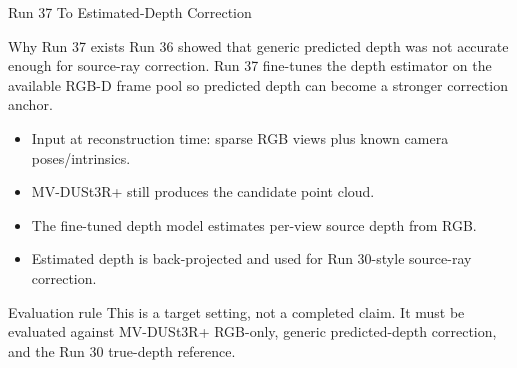 \begin{frame}{Run 37 To Estimated-Depth Correction}
  \footnotesize
  \begin{block}{Why Run 37 exists}
    Run 36 showed that generic predicted depth was not accurate enough for
    source-ray correction. Run 37 fine-tunes the depth estimator on the
    available RGB-D frame pool so predicted depth can become a stronger
    correction anchor.
  \end{block}

  \begin{itemize}
    \item Input at reconstruction time: sparse RGB views plus known camera
    poses/intrinsics.
    \item MV-DUSt3R+ still produces the candidate point cloud.
    \item The fine-tuned depth model estimates per-view source depth from RGB.
    \item Estimated depth is back-projected and used for Run 30-style
    source-ray correction.
  \end{itemize}

  \begin{alertblock}{Evaluation rule}
    This is a target setting, not a completed claim. It must be evaluated
    against MV-DUSt3R+ RGB-only, generic predicted-depth correction, and the
    Run 30 true-depth reference.
  \end{alertblock}
\end{frame}
